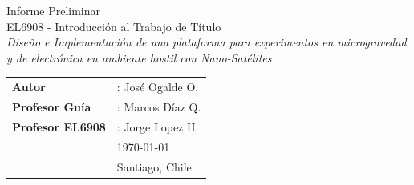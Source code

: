\documentclass[11pt,letterpaper]{article}
\begin{document}
\newpage
\pagestyle{fancy}
\fancyhf{}
\vspace*{6cm}
\begin{center}
\Huge  {Informe Preliminar} \\
\vspace{1cm}
\LARGE {EL6908 - Introducción al Trabajo de Título}\\
\vspace{0.5cm}
\LARGE {\textit{Diseño e Implementación de una plataforma para experimentos en microgravedad y de electrónica en ambiente hostil con Nano-Sat\'elites}}\\
\end{center}
\vfill
\begin{flushright}
\begin{tabular}{ll}
\textbf{Autor} &: Jos\'e Ogalde O.\\
\textbf{Profesor Guía} &: Marcos Díaz Q.\\
\textbf{Profesor EL6908} &: Jorge Lopez H.\\
& \today\\
& Santiago, Chile.
\end{tabular}
\end{flushright}

\newpage
\pagestyle{fancy}
\fancyhf{}
\fancyhead[R]{\small \rm \textbf{\thepage}}
\renewcommand{\sectionmark}[1]{\markright{\thesection.\ #1}}
\renewcommand{\headrulewidth}{0.5pt}
\renewcommand{\footrulewidth}{0.5pt}


\tableofcontents
\listoffigures

\newpage
\end{document}
